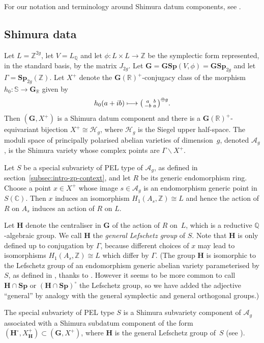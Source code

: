 \documentclass[11pt]{article}
\numberwithin{equation}{section}
\def\mto{\mathchoice{\longmapsto}{\mapsto}{\mapsto}{\mapsto}}
\newcommand{\bC}{\mathbb{C}}
\newcommand{\bQ}{\mathbb{Q}}
\newcommand{\bR}{\mathbb{R}}
\newcommand{\bZ}{\mathbb{Z}}
\newcommand{\Ag}{\mathcal{A}_g}
\newcommand{\Hg}{\mathcal{H}_g}
\newcommand{\gG}{\mathbf{G}}
\newcommand{\gGSp}{\mathbf{GSp}}
\newcommand{\gH}{\mathbf{H}}
\newcommand{\gSp}{\mathbf{Sp}}
\newcommand{\fullsmallmatrix}[4]{\bigl( \begin{smallmatrix} #1 & #2 \\ #3 & #4 \end{smallmatrix} \bigr)}
\newcommand{\defterm}[1]{\emph{#1}}
\begin{document}
For our notation and terminology around Shimura datum components, see \cite[sec.\ 2A and~2B]{ExCM}.

\subsection{Shimura data} \label{subsec:shimura-data}

Let $L=\bZ^{2g}$, let $V = L_\bQ$ and let $\phi:L\times L\to\bZ$ be the symplectic form represented, in the standard basis, by the matrix $J_{2g}$. Let $\gG=\gGSp(V, \phi)=\gGSp_{2g}$ and let $\Gamma=\gSp_{2g}(\bZ)$.
Let $X^+$ denote the $\gG(\bR)^+$-conjugacy class of the morphism $h_0 \colon \mathbb{S}\to\gG_\bR$ given by
\begin{equation} \label{eqn:h0}
h_0(a+ib) \mto \fullsmallmatrix{a}{b}{-b}{a}^{\oplus g}.
\end{equation}
Then $(\gG, X^+)$ is a Shimura datum component and there is a $\gG(\bR)^+$-equivariant bijection $X^+ \cong \Hg$, where $\Hg$ is the Siegel upper half-space.
The moduli space of principally polarised abelian varieties of dimension~$g$, denoted $\Ag$, is the Shimura variety whose complex points are $\Gamma \backslash X^+$.

Let $S$ be a special subvariety of PEL type of $\Ag$, as defined in section~\ref{subsec:intro-zp-context}, and let $R$ be its generic endomorphism ring.
Choose a point $x \in X^+$ whose image $s \in \Ag$ is an endomorphism generic point in $S(\bC)$.
Then $x$ induces an isomorphism $H_1(A_s, \bZ) \cong L$ and hence the action of $R$ on $A_s$ induces an action of $R$ on $L$.

Let $\gH$ denote the centraliser in $\gG$ of the action of $R$ on~$L$, which is a reductive $\bQ$-algebraic group.
We call $\gH$ the \defterm{general Lefschetz group} of $S$.
Note that $\gH$ is only defined up to conjugation by $\Gamma$, because different choices of $x$ may lead to isomorphisms $H_1(A_s, \bZ) \cong L$ which differ by $\Gamma$.
(The group $\gH$ is isomorphic to the Lefschetz group of an endomorphism generic abelian variety parameterised by $S$, as defined in \cite{Mil99}, thanks to \cite[Th.\,4.4]{Mil99}.
However it seems to be more common to call $\gH \cap \gSp$ or $(\gH \cap \gSp)^\circ$ the Lefschetz group, so we have added the adjective ``general'' by analogy with the general symplectic and general orthogonal groups.)

The special subvariety of PEL type $S$ is a Shimura subvariety component of $\Ag$ associated with a Shimura subdatum component of the form $(\gH^\circ, X_\gH^+) \subset (\gG, X^+)$, where $\gH$ is the general Lefschetz group of~$S$ (see \cite[paragraph above Theorem~8.17]{Mil05}).
\end{document}
